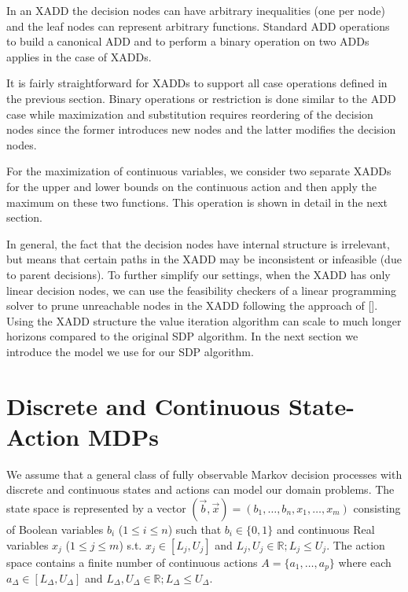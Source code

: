 \documentclass[letterpaper]{article}
\begin{document}
In an XADD the decision nodes can have arbitrary inequalities (one
per node) and the leaf nodes can represent arbitrary functions.
Standard ADD operations to build a canonical ADD and 
to perform a binary operation on two ADDs applies in the case of XADDs.

It is fairly straightforward for XADDs to support all case operations defined in the previous section. 
Binary operations or restriction is done similar to the ADD case while maximization and substitution 
requires reordering of the decision nodes since the former introduces new nodes and the latter modifies
the decision nodes. 

For the maximization of continuous variables, we consider two separate XADDs for the 
upper and lower bounds on the continuous action and then apply the maximum on these two functions. 
This operation is shown in detail in the next section. 

In general, the fact that the decision nodes have internal structure is irrelevant, but means that certain 
paths in the XADD may be inconsistent or infeasible (due to parent decisions).  To further simplify our settings, 
when the XADD has only linear decision nodes, we can use the feasibility checkers of a linear programming solver 
to prune unreachable nodes in the XADD following the approach of []. Using the XADD structure the value
iteration algorithm can scale to much longer horizons compared to the original SDP algorithm. In the next section we introduce the model we use for our SDP algorithm.

\section{Discrete and Continuous State-Action MDPs}

We assume that a general class of fully observable Markov decision processes with discrete and continuous states and actions can model our domain problems.
The state space is represented by a vector $(\vec{b},\vec{x}) = ( b_1,\ldots,b_n,x_{1},\ldots,x_m )$ consisting of Boolean variables
 $b_i$ ($1 \leq i \leq n$) such that $b_i \in \{ 0,1 \}$ and continuous Real variables $x_j$ ($1 \leq j \leq m$) s.t. $x_j \in [L_j,U_j]$ and $L_j,U_j \in
\mathbb{R}; L_j \leq U_j$.  The action space contains a finite number of continuous actions $A
= \{ a_1, \ldots, a_p \}$ where each $a_{\Delta} \in [L_{\Delta},U_{\Delta}]$ and $L_{\Delta},U_{\Delta} \in
\mathbb{R}; L_{\Delta} \leq U_{\Delta}$.
\end{document}
